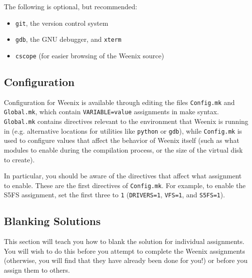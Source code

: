 The following is optional, but recommended:
\begin{itemize}
\item \texttt{git}, the version control system
\item \texttt{gdb}, the GNU debugger, and \texttt{xterm} %
\item \texttt{cscope} (for easier browsing of the Weenix source)
\end{itemize}


\subsection{Configuration}
Configuration for Weenix is available through editing the files \texttt{Config.mk} and \texttt{Global.mk}, which contain \texttt{VARIABLE=value} assignments in make syntax.  \texttt{Global.mk} contains directives relevant to the environment that Weenix is running in (e.g. alternative locations for utilities like \texttt{python} or \texttt{gdb}), while \texttt{Config.mk} is used to configure values that affect the behavior of Weenix itself (such as what modules to enable during the compilation process, or the size of the virtual disk to create).

In particular, you should be aware of the directives that affect what assignment to enable.  These are the first directives of \texttt{Config.mk}.  For example, to enable the S5FS assignment, set the first three to \texttt{1} (\texttt{DRIVERS=1}, \texttt{VFS=1}, and \texttt{S5FS=1}).

\subsection{Blanking Solutions}

This section will teach you how to blank the solution for individual assignments.  You will wish to do this before you attempt to complete the Weenix assignments (otherwise, you will find that they have already been done for you!) or before you assign them to others.

